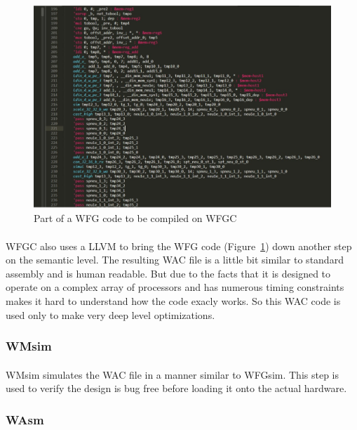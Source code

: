 \begin{figure}[h]
    \centering  
    \includegraphics[trim=0cm 0cm 0cm 0cm, clip=true,scale=0.5]{figures/wfg_eg.jpg}
    \caption{Part of a WFG code to be compiled on WFGC\label{Fig:wfgeg}}\vspace{-4mm}
    \end{figure}

\paragraph{}
WFGC also uses a LLVM to bring the WFG code (Figure~\ref{Fig:wfgeg}) down another step on the semantic level. The resulting WAC file is a little bit similar to standard assembly and is human readable. But due to the facts that it is designed to operate on a complex array of processors and has numerous timing constraints makes it hard to understand how the code exacly works. So this WAC code is used only to make very deep level optimizations.

\subsubsection{WMsim}
\paragraph{}
WMsim simulates the WAC file in a manner similar to WFGsim. This step is used to verify the design is bug free before loading it onto the actual hardware.

\subsubsection{WAsm}
